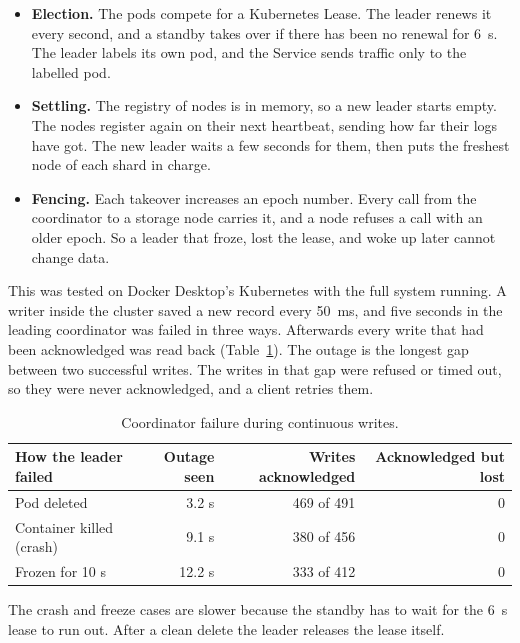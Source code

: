 \documentclass[a4paper,10pt]{article}
\begin{document}
\begin{itemize}
    \item \textbf{Election.} The pods compete for a Kubernetes Lease. The leader renews it every
    second, and a standby takes over if there has been no renewal for 6~s. The leader labels its
    own pod, and the Service sends traffic only to the labelled pod.
    \item \textbf{Settling.} The registry of nodes is in memory, so a new leader starts empty. The
    nodes register again on their next heartbeat, sending how far their logs have got. The new
    leader waits a few seconds for them, then puts the freshest node of each shard in charge.
    \item \textbf{Fencing.} Each takeover increases an epoch number. Every call from the
    coordinator to a storage node carries it, and a node refuses a call with an older epoch. So a
    leader that froze, lost the lease, and woke up later cannot change data.
\end{itemize}

This was tested on Docker Desktop's Kubernetes with the full system running. A writer inside the
cluster saved a new record every 50~ms, and five seconds in the leading coordinator was failed in
three ways. Afterwards every write that had been acknowledged was read back
(Table~\ref{tab:failover}). The outage is the longest gap between two successful writes. The
writes in that gap were refused or timed out, so they were never acknowledged, and a client
retries them.

\begin{table}[htbp]
    \centering
    \small
    \begin{tabular}{l r r r}
        \toprule
        How the leader failed & Outage seen & Writes acknowledged & Acknowledged but lost \\
        \midrule
        Pod deleted & 3.2 s & 469 of 491 & 0 \\
        Container killed (crash) & 9.1 s & 380 of 456 & 0 \\
        Frozen for 10 s & 12.2 s & 333 of 412 & 0 \\
        \bottomrule
    \end{tabular}
    \caption{Coordinator failure during continuous writes.}
    \label{tab:failover}
\end{table}

The crash and freeze cases are slower because the standby has to wait for the 6~s lease to run
out. After a clean delete the leader releases the lease itself.
\end{document}

